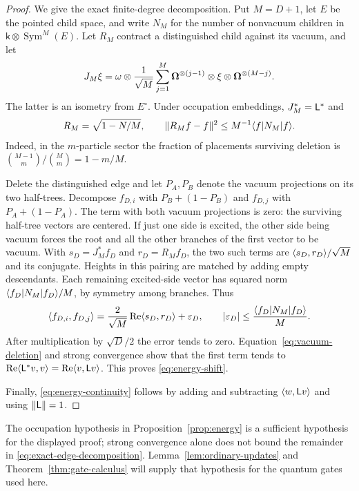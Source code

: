 \begin{proof}
We give the exact finite-degree decomposition.  Put $M=D+1$,
let $E$ be the pointed child space, and write $N_M$ for the
number of nonvacuum children in
$\mathsf k\otimes\operatorname{Sym}^M(E)$.  Let $R_M$ contract
a distinguished child against its vacuum, and let
\[
 J_M\xi=\omega\otimes\frac1{\sqrt M}
 \sum_{j=1}^M\boldsymbol\Omega^{\otimes(j-1)}\otimes\xi
                         \otimes\boldsymbol\Omega^{\otimes(M-j)}.
\]
The latter is an isometry from $E^\circ$.  Under occupation
embeddings, $J_M^*=\mathsf L^*$ and
\begin{equation}\label{eq:vacuum-deletion}
 R_M=\sqrt{1-N/M},\qquad
 \|R_Mf-f\|^2\leq M^{-1}\langle f\rvert N_M\lvert f\rangle.
\end{equation}
Indeed, in the $m$-particle sector the fraction of placements
surviving deletion is
$\binom{M-1}m/\binom Mm=1-m/M$.

Delete the distinguished edge and let $P_A,P_B$ denote the
vacuum projections on its two half-trees.  Decompose $f_{D,i}$
with $P_B+(1-P_B)$ and $f_{D,j}$ with $P_A+(1-P_A)$.
The term with both vacuum projections is zero: the surviving
half-tree vectors are centered.  If just one side is excited,
the other side being vacuum forces the root and all the other
branches of the first vector to be vacuum.  With
$s_D=J_M^*f_D$ and $r_D=R_Mf_D$, the two such terms are
$\langle s_D,r_D\rangle/\sqrt M$ and its conjugate.  Heights in
this pairing are matched by adding empty descendants.  Each
remaining excited-side vector has squared norm
$\langle f_D\rvert N_M\lvert f_D\rangle/M$, by symmetry among branches.  Thus
\begin{equation}\label{eq:exact-edge-decomposition}
 \langle f_{D,i},f_{D,j}\rangle
 =\frac2{\sqrt M}\operatorname{Re}\langle s_D,r_D\rangle+\varepsilon_D,
 \qquad
 |\varepsilon_D|\leq\frac{\langle f_D\rvert N_M\lvert f_D\rangle}M.
\end{equation}
After multiplication by $\sqrt D/2$ the error tends to zero.
Equation~\eqref{eq:vacuum-deletion} and strong convergence show
that the first term tends to
$\operatorname{Re}\langle \mathsf L^*v,v\rangle=\operatorname{Re}\langle v,\mathsf L v\rangle$.
This proves \eqref{eq:energy-shift}.

Finally, \eqref{eq:energy-continuity} follows by adding and subtracting
$\langle w,\mathsf L v\rangle$ and using $\|\mathsf L\|=1$.
\end{proof}

The occupation hypothesis in Proposition~\ref{prop:energy}
is a sufficient hypothesis for the displayed proof; strong
convergence alone does not bound the remainder in
\eqref{eq:exact-edge-decomposition}.  Lemma~\ref{lem:ordinary-updates} and
Theorem~\ref{thm:gate-calculus} will supply that hypothesis for
the quantum gates used here.

